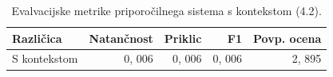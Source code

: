 \begin{table}[h]
\centering
\caption{Evalvacijske metrike priporočilnega sistema s kontekstom (4.2).}
\label{tab:evaluation_metrics_4_2}
\begin{tabular}{lrrrr}
\toprule
Različica & Natančnost & Priklic & F1 & Povp. ocena \\
\midrule
S kontekstom & 0, 006 & 0, 006 & 0, 006 & 2, 895 \\
\bottomrule
\end{tabular}

\end{table}
